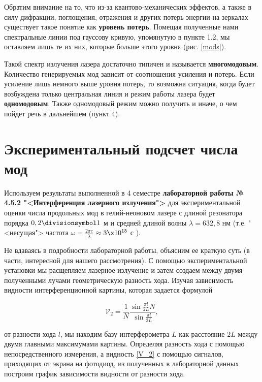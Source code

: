 \documentclass[12pt]{kiarticle}
\begin{document}
Обратим внимание на то, что из-за квантово-механических эффектов, а также в силу дифракции, поглощения, отражения и других потерь энергии на зеркалах существует такое понятие как \textbf{уровень потерь}. Помещая полученные нами спектральные линии под гауссову кривую, упомянутую в пункте 1.2, мы оставляем лишь те их них, которые больше этого уровня (рис. \ref{mods}).


Такой спектр излучения лазера достаточно типичен и называется \textbf{многомодовым}. Количество генерируемых мод
зависит от соотношения усиления и потерь. Если усиление лишь немного выше уровня потерь, то возможна ситуация, когда будет возбуждена
только центральная линия и режим работы лазера будет \textbf{одномодовым}. Также одномодовый режим можно получить и иначе, о чем пойдет речь в дальнейшем (пункт 4).

\section{Экспериментальный подсчет числа мод}

Используем результаты выполненной в 4 семестре \textbf{лабораторной работы № 4.5.2 "<Интерференция лазерного излучения">} для экспериментальной оценки числа продольных мод в гелий-неоновом лазере с длиной резонатора порядка $ 0,2 \divisionsymbol 1 $ м и средней длиной волны $ \lambda = 632,8 $ нм (т.е. "<несущая"> частота $ \omega = \frac{2\pi c}{\lambda} $
$\approx 3 \x 10^{15} $ с ). 

Не вдаваясь в подробности лабораторной работы, объясним ее краткую суть (в части, интересной для нашего рассмотрения). С помощью экспериментальной установки мы расщепляем лазерное излучение и затем создаем между двумя полученными лучами геометрическую разность хода. Изучая зависимость видности интерференционной картины, которая задается формулой

\begin{equation}\label{V_2}
\mathcal{V}_2 = \dfrac{1}{N} \dfrac{\sin {\frac{\pi l}{2L}N}}{\sin {\frac{\pi l}{2L}}},
\end{equation}

от разности хода $ l $, мы находим базу интерферометра $ L $ как расстояние $ 2L $ между двумя главными максимумами картины. Определяя разность хода с помощью непосредственного измерения, а видность \eqref{V_2} с помощью сигналов, приходящих от экрана на фотодиод, из полученных в лабораторной данных построим график зависимости видности от разности хода.
\end{document}
